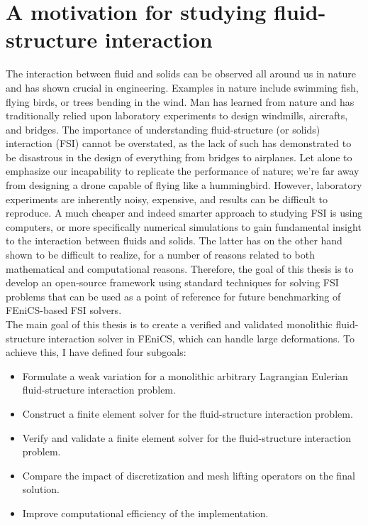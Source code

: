 \chapter{A motivation for studying fluid-structure interaction}
The interaction between fluid and solids can be observed all around us in nature and has shown crucial in engineering. Examples in nature include swimming fish, flying birds, or trees bending in the wind. Man has learned from nature and has traditionally relied upon laboratory experiments to design windmills, aircrafts, and bridges. The importance of understanding fluid-structure (or solids) interaction (FSI) cannot be overstated, as the lack of such has demonstrated to be disastrous in the design of everything from bridges to airplanes. Let alone to emphasize our incapability to replicate the performance of nature; we're far away from designing a drone capable of flying like a hummingbird. However, laboratory experiments are inherently noisy, expensive, and results can be difficult to reproduce. A much cheaper and indeed smarter approach to studying FSI is using computers, or more specifically numerical simulations to gain fundamental insight to the interaction between fluids and solids. The latter has on the other hand shown to be difficult to realize, for a number of reasons related to both mathematical and computational reasons. Therefore, the goal of this thesis is to develop an open-source framework using standard techniques for solving FSI problems that can be used as a point of reference for future benchmarking of FEniCS-based FSI solvers. \\

The main goal of this thesis is to create a verified and validated monolithic fluid-structure interaction solver in FEniCS, which can handle large deformations. To achieve this, I have defined four subgoals: 

\begin{itemize}
\item Formulate a weak variation for a monolithic arbitrary Lagrangian Eulerian fluid-structure interaction problem.
\item Construct a finite element solver for the fluid-structure interaction problem.
\item Verify and validate a finite element solver for the fluid-structure interaction problem.
\item Compare the impact of discretization and mesh lifting operators on the final solution.
\item Improve computational efficiency of the implementation.
\end{itemize}


